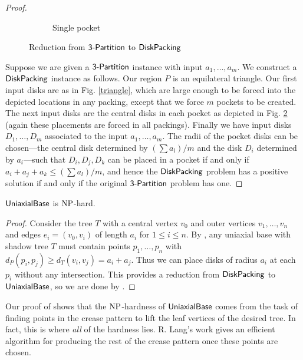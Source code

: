 \begin{proof}
\begin{figure}[h!tbp]
\begin{subfigure}{.35\textwidth}
      \caption{Single pocket}
      \label{pocket}
    \end{subfigure}
    \caption{Reduction from $\mathsf{3\text{-} Partition}$ to $\mathsf{DiskPacking}$}
  \end{figure}
  Suppose we are given a $\mathsf{3\text{-} Partition}$ instance with input
  $a_1,\ldots,a_m$. We construct a $\mathsf{DiskPacking}$ instance as
  follows. Our region $P$ is an equilateral triangle. Our first input
  disks are as in Fig. \ref{triangle}, which are large enough to be
  forced into the depicted locations in any packing, except that we
  force $m$ pockets to be created. The next input disks are the
  central disks in each pocket as depicted in Fig. \ref{pocket} (again
  these placements are forced in all packings). Finally we have input
  disks $D_1,\ldots,D_m$ associated to the input $a_1,\ldots,a_m$. The
  radii of the pocket disks can be chosen---the central disk
  determined by $(\sum a_l)/m$ and the disk $D_i$ determined by
  $a_i$---such that $D_i,D_j,D_k$ can be placed in a pocket if and
  only if $a_i + a_j + a_k \le (\sum a_l)/m$, and hence the
  $\mathsf{DiskPacking}$ problem has a positive solution if and only if the
  original $\mathsf{3\text{-} Partition}$ problem has one.
\end{proof}

\begin{corollary}
  \label{uni-hard}
  $\mathsf{UniaxialBase}$ is $\mathrm{NP}$-hard.
\end{corollary}

\begin{proof}
  Consider the tree $T$ with a central vertex $v_0$ and outer vertices
  $v_1, \ldots, v_n$ and edges $e_i = (v_0,v_i)$ of length $a_i$ for
  $1 \le i \le n$. By , any uniaxial base with shadow
  tree $T$ must contain points $p_1,\ldots,p_n$ with $d_P(p_i,p_j) \ge
  d_T(v_i,v_j) = a_i+a_j$. Thus we can place disks of radius $a_i$ at
  each $p_i$ without any intersection. This provides a reduction from
  $\mathsf{DiskPacking}$ to $\mathsf{UniaxialBase}$, so we are done by
  .
\end{proof}

\begin{remark}
  Our proof of  shows that the $\mathrm{NP}$-hardness of
  $\mathsf{UniaxialBase}$ comes from the task of finding points in the crease
  pattern to lift the leaf vertices of the desired tree. In fact, this
  is where \emph{all} of the hardness lies. R. Lang's work gives an
  efficient algorithm for producing the rest of the crease pattern
  once these points are chosen.
\end{remark}






